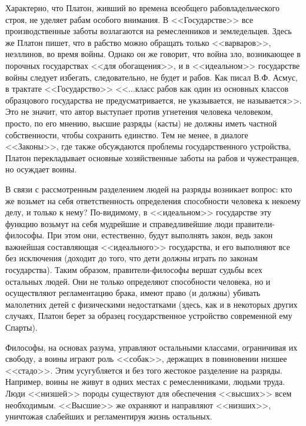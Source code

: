 	Характерно, что Платон, живший во времена всеобщего рабовладельческого 
	строя, не уделяет рабам особого внимания. В <<Государстве>> все 
	производственные заботы возлагаются на ремесленников и земледельцев. Здесь 
	же Платон пишет, что в рабство можно обращать только <<варваров>>, 
	неэллинов, во время войны. Однако он же говорит, что война зло, 
	возникающее в порочных государствах <<для обогащения>>, и в <<идеальном>> 
	государстве войны следует избегать, следовательно, не будет и рабов. 
	Как писал В.Ф. Асмус, в трактате <<Государство>> <<...класс рабов как один 
	из основных классов образцового государства не предусматривается, не 
	указывается, не называется>>. Это не значит, что автор выступает против 
	угнетения человека человеком, просто, по его мнению, высшие разряды 
	(касты) не должны иметь частной собственности, чтобы сохранить единство. 
	Тем не менее, в диалоге <<Законы>>, где также обсуждаются проблемы 
	государственного устройства, Платон перекладывает основные хозяйственные 
	заботы на рабов и чужестранцев, но осуждает воины. 

	В связи с рассмотренным разделением людей на разряды возникает вопрос: 
	кто же возьмет на себя ответственность определения способности человека к 
	некоему делу, и только к нему? По-видимому, в <<идеальном>> государстве эту 
	функцию возьмут на себя мудрейшие и справедливейшие люди 
	правители-философы. При этом они, естественно, будут выполнять закон, 
	ведь закон важнейшая составляющая <<идеального>> государства, и его выполняют 
	все без исключения (доходит до того, что дети должны играть по законам 
	государства). Таким образом, правители-философы вершат судьбы всех 
	остальных людей. Они не только определяют способности человека, но и 
	осуществляют регламентацию брака, имеют право (и должны) убивать 
	малолетних детей с физическими недостатками (здесь, как и в некоторых 
	других случаях, Платон берет за образец государственное устройство 
	современной ему Спарты). 

	Философы, на основах разума, управляют остальными классами, ограничивая их 
	свободу, а воины играют роль <<собак>>, держащих в повиновении низшее <<стадо>>. 
	Этим усугубляется и без того жестокое разделение на разряды. Например, воины 
	не живут в одних местах с ремесленниками, людьми труда. Люди <<низшей>> породы 
	существуют для обеспечения <<высших>> всем необходимым. <<Высшие>> же охраняют и 
	направляют <<низших>>, уничтожая слабейших и регламентируя жизнь остальных. 


